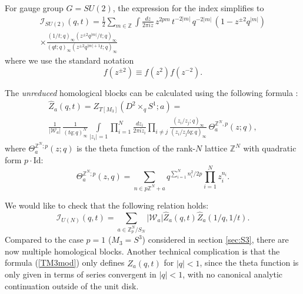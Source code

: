 \documentclass[hyper,letterpaper]{JHEP3}
\newcommand{\be}{\begin{equation}}
\newcommand{\ee}{\end{equation}}
\newcommand{\Z}{{\mathbb Z}}
\renewcommand{\hat}{\widehat}
\def\CI{{\mathcal I}}
\def\CW{{\mathcal W}}
\begin{document}
For gauge group $G=SU(2)$, the expression for the index simplifies to
\begin{multline}
	\CI_{SU(2)}(q,t)=\frac{1}{2}\sum_{m\in \Z}\int \frac{dz}{2\pi i z}\,
	z^{2pm}\,t^{-2|m|}\,q^{-2|m|}\,(1-z^{\pm 2}q^{|m|})
\\
	 \times
	\frac{(1/t;q)_\infty(z^{\pm 2}q^{|m|}/t;q)_\infty}{(qt;q)_\infty(z^{\pm 2}q^{|m|+1}t;q)_\infty}
	\label{I-Lp1-SU2}
\end{multline}
where we use the standard notation
\begin{equation}
 f(z^{\pm 2})\equiv f(z^2)f(z^{-2}).
\end{equation}

The \textit{unreduced} homological blocks can be calculated using the following formula \cite{Gukov:2016gkn}:
\begin{multline}
	 \hat Z_a(q,t)=Z_{T[M_3]}(D^2\times_q S^1;a)=\\
\frac{1}{|\CW_a|}\,\frac{1}{(tq;q)_\infty^N}
	\int\limits_{|z_i|=1} \prod_{i=1}^N \frac{dz_i}{2\pi i z_i}
	\prod_{i\neq j}\frac{(z_i/z_j;q)_\infty}{(z_i/z_jtq;q)_\infty}
	\,\Theta_{a}^{\mathbb{Z}^N,p}(z;q),
	\label{TM3mod}
\end{multline}
where $\Theta_{a}^{\mathbb{Z}^N;p}(z;q)$ is the theta function of the rank-$N$ lattice $\Z^N$ with quadratic form $p\cdot\mathrm{Id}$:
\be
\Theta_{a}^{\Z^N;p}(z, q)=\sum_{n\in p\Z^N+a}q^{\sum_{i=1}^N{n_i^2}/2p}\prod_{i=1}^Nz_i^{n_i}.
\ee

We would like to check that the following relation holds:
\begin{equation}
	\CI_{U(N)}(q,t)=\sum_{a\in \Z_p^N/S_N} |\CW_a|\hat{Z}_a(q,t)\hat{Z}_a(1/q,1/t).
	\label{Index-factorization}
\end{equation}
Compared to the case $p=1$ ($M_3=S^3$) considered in section \ref{sec:S3},  there are now multiple homological blocks. Another technical complication is that the formula (\ref{TM3mod}) only defines $\hat Z_a(q,t)$ for $|q|<1$, since the theta function is only given in terms of series convergent in $|q|<1$, with no canonical analytic continuation outside of the unit disk.
\end{document}
